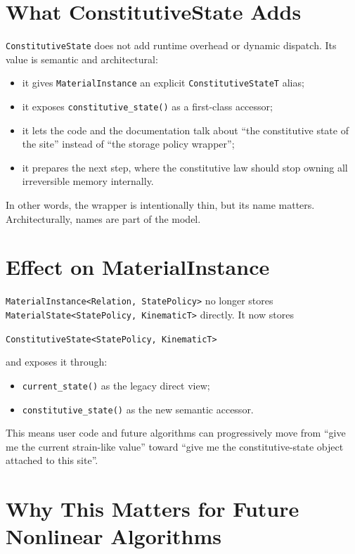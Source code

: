 \section{What ConstitutiveState Adds}

\texttt{ConstitutiveState} does not add runtime overhead or dynamic dispatch.
Its value is semantic and architectural:

\begin{itemize}
  \item it gives \texttt{MaterialInstance} an explicit
        \texttt{ConstitutiveStateT} alias;
  \item it exposes \texttt{constitutive\_state()} as a first-class accessor;
  \item it lets the code and the documentation talk about ``the constitutive
        state of the site'' instead of ``the storage policy wrapper'';
  \item it prepares the next step, where the constitutive law should stop
        owning all irreversible memory internally.
\end{itemize}

In other words, the wrapper is intentionally thin, but its name matters.
Architecturally, names are part of the model.

\section{Effect on MaterialInstance}

\texttt{MaterialInstance<Relation, StatePolicy>} no longer stores
\texttt{MaterialState<StatePolicy, KinematicT>} directly.  It now stores

\begin{center}
\texttt{ConstitutiveState<StatePolicy, KinematicT>}
\end{center}

and exposes it through:

\begin{itemize}
  \item \texttt{current\_state()} as the legacy direct view;
  \item \texttt{constitutive\_state()} as the new semantic accessor.
\end{itemize}

This means user code and future algorithms can progressively move from
``give me the current strain-like value'' toward
``give me the constitutive-state object attached to this site''.

\section{Why This Matters for Future Nonlinear Algorithms}

